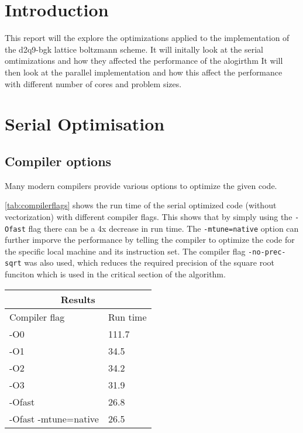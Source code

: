 \documentclass{article}
\begin{document}
\begin{multicols}{2}

\section{Introduction}

This report will the explore the optimizations applied to the implementation of
the d2q9-bgk lattice boltzmann scheme. It will initally look at the serial
omtimizations and how they affected the performance of the alogirthm It will
then look at the parallel implementation and how this affect the performance
with different number of cores and problem sizes.

\section{Serial Optimisation}

\subsection{Compiler options}

Many modern compilers provide various options to optimize the given code. 

\autoref{tab:compilerflags} shows the run time of the serial optimized code
(without vectorization) with different compiler flags. This shows that by
simply using the \verb|-Ofast| flag there can be a 4x decrease in run time. The
\verb|-mtune=native| option can further imporve the performance by telling the
compiler to optimize the code for the specific local machine and its
instruction set. The compiler flag \verb|-no-prec-sqrt| was also used, which
reduces the required precision of the square root funciton which is used in the
critical section of the algorithm.

\begin{center}
  \begin{tabular}{ |p{5cm}||p{1.5cm}| }
 \hline
 \multicolumn{2}{|c|}{Results} \\
 \hline
 Compiler flag & Run time \\
 \hline
 -O0                  & 111.7   \\
 -O1                  & 34.5   \\
 -O2                  & 34.2   \\ 
 -O3                  & 31.9   \\ 
 -Ofast               & 26.8   \\ 
 -Ofast -mtune=native & 26.5   \\
 \hline
\end{tabular}
\label{tab:compilerflags}
\end{center}


\end{multicols}
\end{document}
